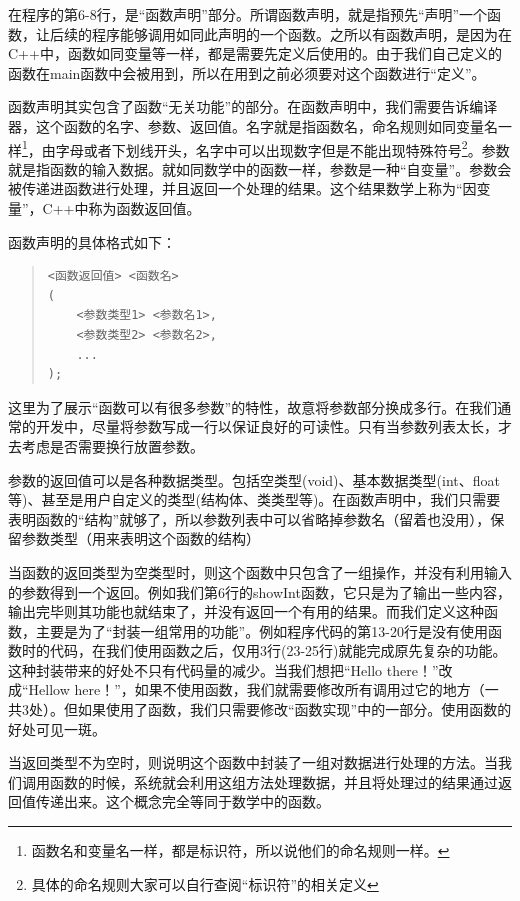 在程序的第6-8行，是“函数声明”部分。所谓函数声明，就是指预先“声明”一个函数，让后续的程序能够调用如同此声明的一个函数。之所以有函数声明，是因为在C++中，函数如同变量等一样，都是需要先定义后使用的。由于我们自己定义的函数在main函数中会被用到，所以在用到之前必须要对这个函数进行“定义”。

函数声明其实包含了函数“无关功能”的部分。在函数声明中，我们需要告诉编译器，这个函数的名字、参数、返回值。名字就是指函数名，命名规则如同变量名一样\footnote{函数名和变量名一样，都是标识符，所以说他们的命名规则一样。}，由字母或者下划线开头，名字中可以出现数字但是不能出现特殊符号\footnote{具体的命名规则大家可以自行查阅“标识符”的相关定义}。参数就是指函数的输入数据。就如同数学中的函数一样，参数是一种“自变量”。参数会被传递进函数进行处理，并且返回一个处理的结果。这个结果数学上称为“因变量”，C++中称为函数返回值。

函数声明的具体格式如下：
\begin{quote}
\begin{lstlisting}
<函数返回值> <函数名>
(
    <参数类型1> <参数名1>,
    <参数类型2> <参数名2>,
    ...
);
\end{lstlisting}
\end{quote}

这里为了展示“函数可以有很多参数”的特性，故意将参数部分换成多行。在我们通常的开发中，尽量将参数写成一行以保证良好的可读性。只有当参数列表太长，才去考虑是否需要换行放置参数。

参数的返回值可以是各种数据类型。包括空类型(void)、基本数据类型(int、float等)、甚至是用户自定义的类型(结构体、类类型等)。在函数声明中，我们只需要表明函数的“结构”就够了，所以参数列表中可以省略掉参数名（留着也没用），保留参数类型（用来表明这个函数的结构）

当函数的返回类型为空类型时，则这个函数中只包含了一组操作，并没有利用输入的参数得到一个返回。例如我们第6行的showInt函数，它只是为了输出一些内容，输出完毕则其功能也就结束了，并没有返回一个有用的结果。而我们定义这种函数，主要是为了“封装一组常用的功能”。例如程序代码的第13-20行是没有使用函数时的代码，在我们使用函数之后，仅用3行(23-25行)就能完成原先复杂的功能。这种封装带来的好处不只有代码量的减少。当我们想把“Hello there！”改成“Hellow here！”，如果不使用函数，我们就需要修改所有调用过它的地方（一共3处）。但如果使用了函数，我们只需要修改“函数实现”中的一部分。使用函数的好处可见一斑。

当返回类型不为空时，则说明这个函数中封装了一组对数据进行处理的方法。当我们调用函数的时候，系统就会利用这组方法处理数据，并且将处理过的结果通过返回值传递出来。这个概念完全等同于数学中的函数。

